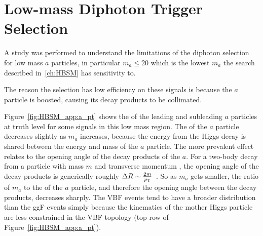 \section{Low-mass Diphoton Trigger Selection}
\label{sec:HBSM_app:lowmass}
A study was performed to understand the limitations of the diphoton selection for low mass $a$ particles, in particular $m_a\le20$ \GeV{} which is the lowest $m_a$ the search described in~\ref{ch:HBSM} has sensitivity to.

The reason the selection has low efficiency on these signals is because the $a$ particle is boosted, causing its decay products to be collimated.

Figure~\ref{fig:HBSM_app:a_pt} shows the \pt{} of the leading and subleading $a$ particles at truth level for some signals in this low mass region.
The \pt{} of the $a$ particle decreases slightly as $m_a$ increases, because the energy from the Higgs decay is shared between the energy and mass of the $a$ particle.
The more prevalent effect relates to the opening angle of the decay products of the $a$.
For a two-body decay from a particle with mass $m$ and transverse momentum \pt{}, the opening angle of the decay products is generically roughly $\Delta R \sim \frac{2m}{p_{\text{T}}}$~\cite{Shelton:2013an}.
So as $m_a$ gets smaller, the ratio of $m_a$ to the \pt{} of the $a$ particle, and therefore the opening angle between the decay products, decreases sharply.
The VBF events tend to have a broader distribution than the ggF events simply because the kinematics of the mother Higgs particle are less constrained in the VBF topology (top row of Figure~\ref{fig:HBSM_app:a_pt}).
